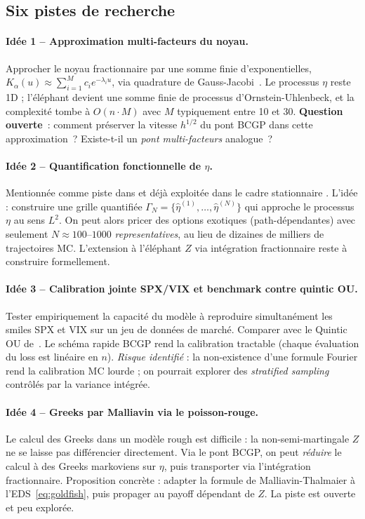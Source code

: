 \documentclass[11pt,a4paper]{article}
\theoremstyle{definition}
\newcommand{\1}{\mathbf{1}}
\begin{document}
\subsection{Six pistes de recherche}

\paragraph{Idée 1 -- Approximation multi-facteurs du noyau.}
Approcher le noyau fractionnaire par une somme finie d'exponentielles,
$K_\alpha(u) \approx \sum_{i=1}^M c_i e^{-\lambda_i u}$, via quadrature de
Gauss-Jacobi~\cite{AJE19}. Le processus $\eta$ reste 1D ; l'éléphant devient une
somme finie de processus d'Ornstein-Uhlenbeck, et la complexité tombe à
$O(n\cdot M)$ avec $M$ typiquement entre 10 et 30. \textbf{Question ouverte}~:
comment préserver la vitesse $h^{1/2}$ du pont BCGP dans cette approximation~?
Existe-t-il un \textit{pont multi-facteurs} analogue~?

\paragraph{Idée 2 -- Quantification fonctionnelle de $\eta$.}
Mentionnée comme piste dans \cite{BCGP23} et déjà exploitée dans le cadre
stationnaire \cite{LMP22}. L'idée : construire une grille quantifiée
$\Gamma_N = \{\hat\eta^{(1)},\dots,\hat\eta^{(N)}\}$ qui approche le processus
$\eta$ au sens $L^2$. On peut alors pricer des options exotiques
(path-dépendantes) avec seulement $N\approx 100$--$1000$ \textit{representatives},
au lieu de dizaines de milliers de trajectoires MC. L'extension à l'éléphant
$Z$ via intégration fractionnaire reste à construire formellement.

\paragraph{Idée 3 -- Calibration jointe SPX/VIX et benchmark contre quintic OU.}
Tester empiriquement la capacité du modèle à reproduire simultanément les smiles
SPX et VIX sur un jeu de données de marché. Comparer avec le Quintic OU
de~\cite{AIL22}. Le schéma rapide BCGP rend la calibration tractable
(chaque évaluation du loss est linéaire en $n$). \textit{Risque identifié} : la
non-existence d'une formule Fourier rend la calibration MC lourde ; on pourrait
explorer des \emph{stratified sampling} contrôlés par la variance intégrée.

\paragraph{Idée 4 -- Greeks par Malliavin via le poisson-rouge.}
Le calcul des Greeks dans un modèle rough est difficile : la non-semi-martingale
$Z$ ne se laisse pas différencier directement. Via le pont BCGP, on peut
\emph{réduire} le calcul à des Greeks markoviens sur $\eta$, puis transporter via
l'intégration fractionnaire. Proposition concrète : adapter la formule de
Malliavin-Thalmaier à l'EDS~\eqref{eq:goldfish}, puis propager au payoff dépendant
de $Z$. La piste est ouverte et peu explorée.
\end{document}
